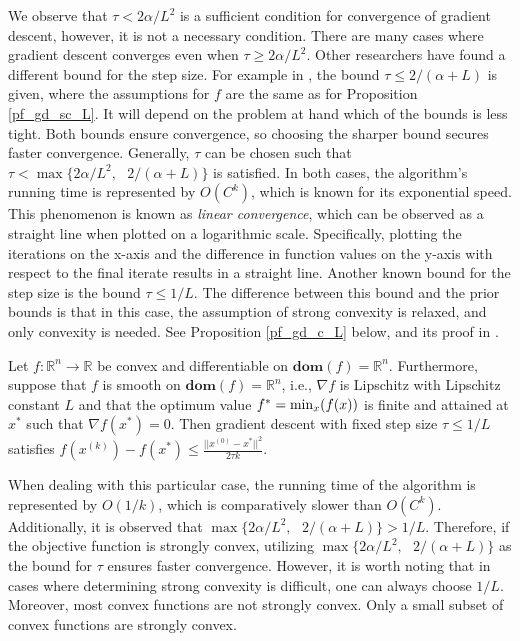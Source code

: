 We observe that $\tau < 2\alpha / L^{2}$ is a sufficient condition for convergence of gradient descent, however, it is not a necessary condition. There are many cases where gradient descent converges even when $\tau \geq 2\alpha / L^{2}$. Other researchers have found a different bound for the step size. For example in \cite[10]{GDandLS}, the bound $\tau \leq 2/(\alpha+L)$ is given, where the assumptions for $f$ are the same as for Proposition \ref{pf_gd_sc_L}. It will depend on the problem at hand which of the bounds is less tight. Both bounds ensure convergence, so choosing the sharper bound secures faster convergence. Generally, $\tau$ can be chosen such that $\tau < \max\{2\alpha / L^{2},\text{ } 2/(\alpha+L)\}$ is satisfied. In both cases, the algorithm's running time is represented by $O(C^{k})$, which is known for its exponential speed. This phenomenon is known as \textit{linear convergence}, which can be observed as a straight line when plotted on a logarithmic scale. Specifically, plotting the iterations on the x-axis and the difference in function values on the y-axis with respect to the final iterate results in a straight line. Another known bound for the step size is the bound $\tau \leq 1/L.$ The difference between this bound and the prior bounds is that in this case, the assumption of strong convexity is relaxed, and only convexity is needed. See Proposition \ref{pf_gd_c_L} below, and its proof in \cite[9]{GDandLS}.
\begin{proposition}\label{pf_gd_c_L}
\textnormal{\cite[9]{GDandLS}}
Let $f: \mathbb{R}^{n}\longrightarrow \mathbb{R}$ be convex and differentiable on $\textbf{dom}(f)= \mathbb{R}^{n}.$ Furthermore, suppose that $f$ is smooth on $\textbf{dom}(f) = \mathbb{R}^{n}$, i.e., $\nabla f$ is Lipschitz with Lipschitz constant $L$ and that the optimum value $f^{*} = \textnormal{min}_{x}(f(x))$ is finite and attained at $x^{*}$ such that $\nabla f(x^{*})=0.$ Then gradient descent with fixed step size $\tau \leq 1/L$ satisfies $f(x^{(k)})-f(x^{*}) \leq \frac{||x^{(0)}-x^{*}||^{2}}{2\tau k}.$ 
\end{proposition}
When dealing with this particular case, the running time of the algorithm is represented by $O(1/k)$, which is comparatively slower than $O(C^{k})$. Additionally, it is observed that $\max\{2\alpha / L^{2},\text{ } 2/(\alpha+L)\} > 1/L.$ Therefore, if the objective function is strongly convex, utilizing $\max\{2\alpha / L^{2},\text{ } 2/(\alpha+L)\}$ as the bound for $\tau$ ensures faster convergence. However, it is worth noting that in cases where determining strong convexity is difficult, one can always choose $1/L$. Moreover, most convex functions are not strongly convex. Only a small subset of convex functions are strongly convex.
